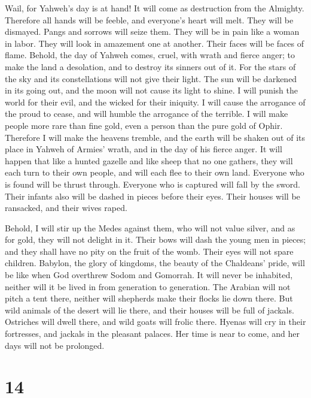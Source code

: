  Wail, for Yahweh's day is at hand! It will come as
destruction from the Almighty.  Therefore all hands will be
feeble, and everyone's heart will melt.  They will be
dismayed. Pangs and sorrows will seize them. They will be in pain like a
woman in labor. They will look in amazement one at another. Their faces
will be faces of flame.  Behold, the day of Yahweh comes,
cruel, with wrath and fierce anger; to make the land a desolation, and
to destroy its sinners out of it.  For the stars of the sky
and its constellations will not give their light. The sun will be
darkened in its going out, and the moon will not cause its light to
shine.  I will punish the world for their evil, and the
wicked for their iniquity. I will cause the arrogance of the proud to
cease, and will humble the arrogance of the terrible.  I
will make people more rare than fine gold, even a person than the pure
gold of Ophir.  Therefore I will make the heavens tremble,
and the earth will be shaken out of its place in Yahweh of Armies'
wrath, and in the day of his fierce anger.  It will happen
that like a hunted gazelle and like sheep that no one gathers, they will
each turn to their own people, and will each flee to their own land.
 Everyone who is found will be thrust through. Everyone who
is captured will fall by the sword.  Their infants also
will be dashed in pieces before their eyes. Their houses will be
ransacked, and their wives raped.

 Behold, I will stir up the Medes against them, who will
not value silver, and as for gold, they will not delight in it.
 Their bows will dash the young men in pieces; and they
shall have no pity on the fruit of the womb. Their eyes will not spare
children.  Babylon, the glory of kingdoms, the beauty of
the Chaldeans' pride, will be like when God overthrew Sodom and
Gomorrah.  It will never be inhabited, neither will it be
lived in from generation to generation. The Arabian will not pitch a
tent there, neither will shepherds make their flocks lie down there.
 But wild animals of the desert will lie there, and their
houses will be full of jackals. Ostriches will dwell there, and wild
goats will frolic there.  Hyenas will cry in their
fortresses, and jackals in the pleasant palaces. Her time is near to
come, and her days will not be prolonged.

\hypertarget{section-13}{%
\section{14}\label{section-13}}

